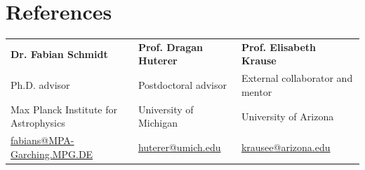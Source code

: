 \section*{References}
\begin{tabularx}{\textwidth}{@{}X X X@{}}
\textbf{Dr. Fabian Schmidt} & \textbf{Prof. Dragan Huterer} & \textbf{Prof. Elisabeth Krause}\\
Ph.D. advisor & Postdoctoral advisor & External collaborator and mentor\\
Max Planck Institute for Astrophysics & University of Michigan & University of Arizona\\
\href{mailto:fabians@MPA-Garching.MPG.DE}{fabians@MPA-Garching.MPG.DE} &
\href{mailto:huterer@umich.edu}{huterer@umich.edu} &
\href{mailto:krausee@arizona.edu}{krausee@arizona.edu}
\end{tabularx}


